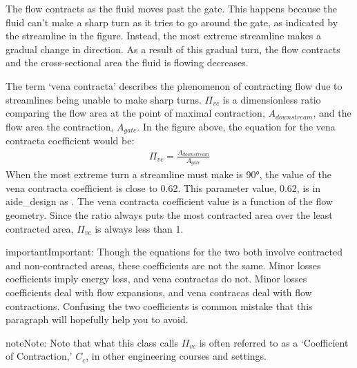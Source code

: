 \documentclass[letterpaper,10pt,english]{sphinxmanual}
\begin{document}
The flow contracts as the fluid moves past the gate. This happens because the fluid can’t make a sharp turn as it tries to go around the gate, as indicated by the streamline in the figure. Instead, the most extreme streamline makes a gradual change in direction. As a result of this gradual turn, the flow contracts and the cross-sectional area the fluid is flowing decreases.

The term ‘vena contracta’ describes the phenomenon of contracting flow due to streamlines being unable to make sharp turns. \(\Pi_{vc}\) is a dimensionless ratio comparing the flow area at the point of maximal contraction, \(A_{downstream}\), and the flow area  the contraction, \(A_{gate}\). In the figure above, the equation for the vena contracta coefficient would be:
\begin{equation}\label{equation:Fluids_Review/Fluids_Review_Design:Fluids_Review/Fluids_Review_Design:30}
\begin{split}\Pi_{vc} = \frac{A_{downstream}}{A_{gate}}\end{split}
\end{equation}
When the most extreme turn a streamline must make is 90°, the value of the vena contracta coefficient is close to 0.62. This parameter value, 0.62, is in aide\_design as . The vena contracta coefficient value is a function of the flow geometry. Since the ratio always puts the most contracted area over the least contracted area, \(\Pi_{vc}\) is always less than 1.

\begin{sphinxadmonition}{important}{Important:}
 Though the equations for the two both involve contracted and non-contracted areas, these coefficients are not the same. Minor losses coefficients imply energy loss, and vena contractas do not. Minor losses coefficients deal with flow expansions, and vena contracas deal with flow contractions. Confusing the two coefficients is common mistake that this paragraph will hopefully help you to avoid.
\end{sphinxadmonition}

\begin{sphinxadmonition}{note}{Note:}
Note that what this class calls \(\Pi_{vc}\) is often referred to as a ‘Coefficient of Contraction,’ \(C_c\), in other engineering courses and settings.
\end{sphinxadmonition}
\end{document}

